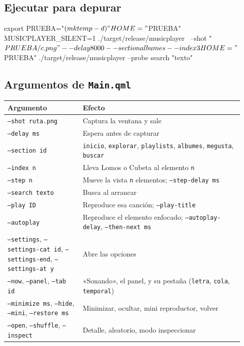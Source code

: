 \subsection{Ejecutar para depurar}

\begin{terminal}
export PRUEBA="$(mktemp -d)"
HOME="$PRUEBA" MUSICPLAYER_SILENT=1 ./target/release/musicplayer \
    --shot "$PRUEBA/c.png" --delay 8000 --section albumes --index 3
HOME="$PRUEBA" ./target/release/musicplayer --probe search "texto"
\end{terminal}

\subsection{Argumentos de \texttt{Main.qml}}

\begin{center}
\small
\begin{longtable}{@{}p{0.3\linewidth}p{0.64\linewidth}@{}}
\toprule
Argumento & Efecto \\
\midrule
\endhead
\texttt{--shot ruta.png} & Captura la ventana y sale \\
\texttt{--delay ms} & Espera antes de capturar \\
\texttt{--section id} & \texttt{inicio}, \texttt{explorar}, \texttt{playlists}, \texttt{albumes}, \texttt{megusta}, \texttt{buscar} \\
\texttt{--index n} & Lleva Lomos o Cubeta al elemento \texttt{n} \\
\texttt{--step n} & Mueve la vista \texttt{n} elementos; \texttt{--step-delay ms} \\
\texttt{--search texto} & Busca al arrancar \\
\texttt{--play ID} & Reproduce esa canción; \texttt{--play-title} \\
\texttt{--autoplay} & Reproduce el elemento enfocado; \texttt{--autoplay-delay}, \texttt{--then-next ms} \\
\texttt{--settings}, \texttt{--settings-cat id}, \texttt{--settings-end}, \texttt{--settings-at y} & Abre las opciones \\
\texttt{--now}, \texttt{--panel}, \texttt{--tab id} & «Sonando», el panel, y su pestaña (\texttt{letra}, \texttt{cola}, \texttt{temporal}) \\
\texttt{--minimize ms}, \texttt{--hide}, \texttt{--mini}, \texttt{--restore ms} & Minimizar, ocultar, mini reproductor, volver \\
\texttt{--open}, \texttt{--shuffle}, \texttt{--inspect} & Detalle, aleatorio, modo inspeccionar \\
\bottomrule
\end{longtable}
\end{center}

